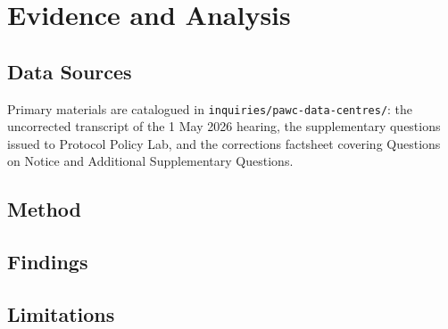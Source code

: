 \chapter{Evidence and Analysis}
\label{ch:evidence}


\section{Data Sources}
\label{sec:evidence:sources}

Primary materials are catalogued in \texttt{inquiries/pawc-data-centres/}: the uncorrected transcript of the 1 May 2026 hearing, the supplementary questions issued to Protocol Policy Lab, and the corrections factsheet covering Questions on Notice and Additional Supplementary Questions.

\section{Method}
\label{sec:evidence:method}

\lipsum[1]

\section{Findings}
\label{sec:evidence:findings}

\lipsum[2-3]

\section{Limitations}
\label{sec:evidence:limitations}

\lipsum[4]

